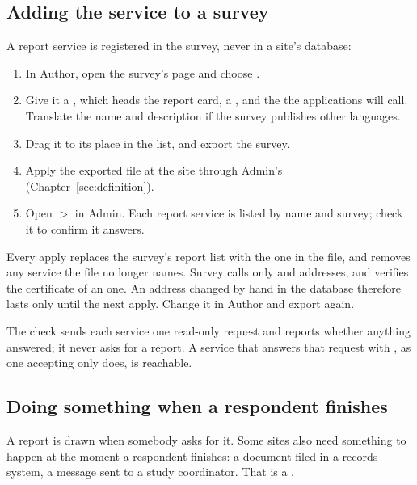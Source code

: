 \documentclass[11pt, a4paper]{article}
\begin{document}
\subsection{Adding the service to a survey}

A report service is registered in the survey, never in a site's database:

\begin{enumerate}
  \item In Author, open the survey's  page and choose
        .
  \item Give it a , which heads the report card, a , and the
         the applications will call. Translate the name and description if the
        survey publishes other languages.
  \item Drag it to its place in the list, and export the survey.
  \item Apply the exported file at the site through Admin's 
        (Chapter~\ref{sec:definition}).
  \item Open  $>$  in Admin. Each report service is listed by
        name and survey; check it to confirm it answers.
\end{enumerate}

\begin{elicitnote}
Every apply replaces the survey's report list with the one in the file, and removes any service
the file no longer names. Survey calls only  and  addresses, and verifies
the certificate of an  one. An address changed by hand in the database therefore lasts only until
the next apply. Change it in Author and export again.
\end{elicitnote}

The  check sends each service one read-only request and reports whether
anything answered; it never asks for a report. A service that answers that request with
, as one accepting only  does, is reachable.

\subsection{Doing something when a respondent finishes}
\label{sec:psa}

A report is drawn when somebody asks for it. Some sites also need something to happen at the
moment a respondent finishes: a document filed in a records system, a message sent to a
study coordinator. That is a .
\end{document}
